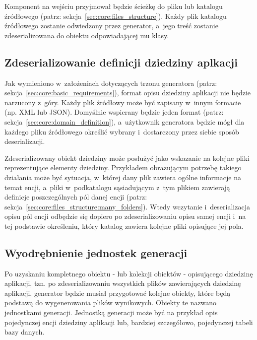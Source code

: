 Komponent na wejściu przyjmował będzie ścieżkę do pliku lub katalogu źródłowego (patrz: sekcja~\ref{sec:core:files_structure}).
Każdy plik katalogu źródłowego zostanie odwiedzony przez generator, a~jego treść zostanie zdeserializowana do obiektu odpowiadającej mu klasy.


\subsection{Zdeserializowanie definicji dziedziny aplkacji}

Jak wymieniono w~założeniach dotyczących trzonu generatora (patrz: sekcja~\ref{sec:core:basic_requirements}), format opisu dziedziny aplikacji nie będzie narzucony z~góry.
Każdy plik źródłowy może być zapisany w~innym formacie (np. XML lub JSON).
Domyślnie wspierany będzie jeden format (patrz: sekcja~\ref{sec:core:domain_definition}), a~użytkownik generatora będzie mógł dla każdego pliku źródłowego określić wybrany i~dostarczony przez siebie sposób deserializacji.

Zdeserializowany obiekt dziedziny może posłużyć jako wskazanie na kolejne pliki reprezentujące elementy dziedziny.
Przykładem obrazującym potrzebę takiego działania może być sytuacja, w~której dany plik zawiera ogólne informacje na temat encji, a~pliki w~podkatalogu sąsiadującym z~tym plikiem zawierają definicje poszczególnych pól danej encji (patrz: sekcja~\ref{sec:core:files_structure:many_folders}).
Wtedy wczytanie i~deserializacja opisu pól encji odbędzie się dopiero po zdeserializowaniu opisu samej encji i~na tej podstawie określeniu, który katalog zawiera kolejne pliki opisujące jej pola. 


\subsection{Wyodrębnienie jednostek generacji}

Po uzyskaniu kompletnego obiektu - lub kolekcji obiektów - opisującego dziedzinę aplikacji, tzn. po zdeserializowaniu wszystkich plików zawierających dziedzinę aplikacji, generator będzie musiał przygotować kolejne obiekty, które będą podstawą do wygenerowania plików wynikowych.
Obiekty te nazwano jednostkami generacji.
Jednostką generacji może być na przykład opis pojedynczej encji dziedziny aplikacji lub, bardziej szczegółowo, pojedynczej tabeli bazy danych.

